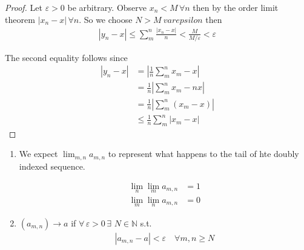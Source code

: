 \begin{proof}
    Let $\varepsilon > 0$ be arbitrary.
    Observe $x_n < M \, \forall n$ then by the order limit theorem $|x_n - x| \, \forall n$.
    So we choose $N > M \ varepsilon$ then
    \begin{align*}
        |y_n - x| \leq \sum_m^n \frac{|x_n-x|}{n} < \frac{M}{M/\varepsilon} < \varepsilon
    \end{align*}

    The second equality follows since
    \begin{align*}
        |y_n - x| &=  \left| \frac{1}{n}\sum_m^n x_m - x\right| \\
        &= \frac{1}{n} \left| \sum_m^n x_m - nx \right| \\
        &= \frac{1}{n} \left| \sum_m^n (x_m - x) \right| \\
        &\leq \frac{1}{n}  \sum_m^n \left|x_m - x \right|
    \end{align*}
\end{proof}

\begin{enumerate}[label=(\alph*)]
    \item 
    We expect $\lim_{m,n}a_{m,n}$ to represent what happens to the tail 
    of hte doubly indexed sequence. 

    \begin{align*}
        \lim_n \lim_m a_{m,n} &= 1 \\
        \lim_m \lim_n a_{m,n} &= 0
    \end{align*}

    \item 
    \begin{definition}
        $(a_{m,n}) \rightarrow a$ if $\forall \, \varepsilon > 0 \, \exists$
        $N \in \mathbb{N}$ s.t. 
        \begin{align*}
            |a_{m,n} - a| < \varepsilon \quad \forall m,n \geq N
        \end{align*} 
    \end{definition}
\end{enumerate}
